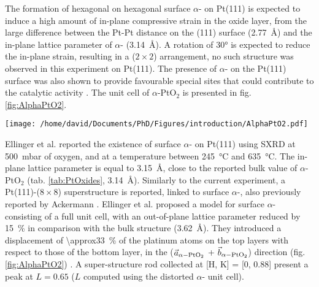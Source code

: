 The formation of hexagonal on hexagonal surface $\alpha$- on Pt(111) is expected to induce a high amount of in-plane compressive strain in the oxide layer, from the large difference between the Pt-Pt distance on the (111) surface (\qty{2.77}{\angstrom}) and the in-plane lattice parameter of $\alpha$- (\qty{3.14}{\angstrom}).
A rotation of \ang{30} is expected to reduce the in-plane strain, resulting in a ($2\times2$) arrangement, no such structure was observed in this experiment on Pt(111).
The presence of $\alpha$- on the Pt(111) surface was also shown to provide favourable special sites that could contribute to the catalytic activity \parencite{Li2005}.
The unit cell of $\alpha$-PtO$_2$ is presented in fig. \ref{fig:AlphaPtO2}.

\begin{SCfigure}
    \centering
    \texttt{[image: /home/david/Documents/PhD/Figures/introduction/AlphaPtO2.pdf]}
    \caption{
        $\alpha$- bulk unit cell.
        Platinum atoms are situated on the unit cell corners (blue) while the two oxygen atoms are at the positions $(1/3, 2/3, 1/4)$ and $(2/3, 1/3, 3/4)$ (orange).
    }
    \label{fig:AlphaPtO2}
\end{SCfigure}

Ellinger et al. \parencite*{Ellinger2008} reported the existence of surface $\alpha$- on Pt(111) using SXRD at \qty{500}{\milli\bar} of oxygen, and at a temperature between \qty{245}{\degreeCelsius} and \qty{635}{\degreeCelsius}.
The in-plane lattice parameter is equal to \qty{3.15}{\angstrom}, close to the reported bulk value of $\alpha$-PtO$_2$ (tab. \ref{tab:PtOxides}, \qty{3.14}{\angstrom}).
Similarly to the current experiment, a Pt(111)-($8\times8$) superstructure is reported, linked to surface $\alpha$-,  also previously reported by Ackermann \parencite*{Ackermann2007}.
Ellinger et al. \parencite*{Ellinger2008} proposed a model for surface $\alpha$- consisting of a full unit cell, with an out-of-plane lattice parameter reduced by \qty{15}{\percent} in comparison with the bulk structure (\qty{3.62}{\angstrom}).
They introduced a displacement of \qty{\approx33}{\percent} of the platinum atoms on the top layers with respect to those of the bottom layer, in the ($\vec{a}_{\alpha-\ce{PtO_2}}$ + $\vec{b}_{\alpha-\ce{PtO_2}}$) direction (fig. \ref{fig:AlphaPtO2}) .
A super-structure rod collected at [H, K] = [0, 0.88] present a peak at $L=0.65$ ($L$ computed using the distorted $\alpha$- unit cell).

